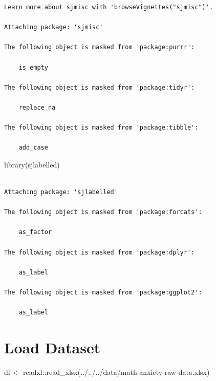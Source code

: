 \documentclass[
  letterpaper,
  DIV=11,
  numbers=noendperiod]{scrartcl}
\newenvironment{Shaded}{\begin{snugshade}}{\end{snugshade}}
\newcommand{\FunctionTok}[1]{\textcolor[rgb]{0.02,0.16,0.49}{#1}}
\newcommand{\NormalTok}[1]{\textcolor[rgb]{0.00,0.44,0.13}{#1}}
\newcommand{\OtherTok}[1]{\textcolor[rgb]{0.00,0.44,0.13}{#1}}
\newcommand{\SpecialCharTok}[1]{\textcolor[rgb]{0.25,0.44,0.63}{#1}}
\newcommand{\StringTok}[1]{\textcolor[rgb]{0.25,0.44,0.63}{#1}}
\begin{document}
\begin{verbatim}
Learn more about sjmisc with 'browseVignettes("sjmisc")'.

Attaching package: 'sjmisc'

The following object is masked from 'package:purrr':

    is_empty

The following object is masked from 'package:tidyr':

    replace_na

The following object is masked from 'package:tibble':

    add_case
\end{verbatim}

\begin{Shaded}
\begin{Highlighting}[]
\FunctionTok{library}\NormalTok{(sjlabelled)}
\end{Highlighting}
\end{Shaded}

\begin{verbatim}

Attaching package: 'sjlabelled'

The following object is masked from 'package:forcats':

    as_factor

The following object is masked from 'package:dplyr':

    as_label

The following object is masked from 'package:ggplot2':

    as_label
\end{verbatim}

\hypertarget{load-dataset}{%
\section{Load Dataset}\label{load-dataset}}

\begin{Shaded}
\begin{Highlighting}[]
\NormalTok{df }\OtherTok{\textless{}{-}}\NormalTok{ readxl}\SpecialCharTok{::}\FunctionTok{read\_xlsx}\NormalTok{(}\StringTok{\textquotesingle{}../../../data/math{-}anxiety{-}raw{-}data.xlsx\textquotesingle{}}\NormalTok{)}
\end{Highlighting}
\end{Shaded}
\end{document}
